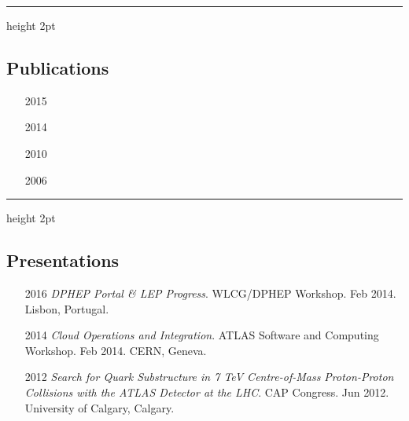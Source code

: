 \documentclass[12pt,a4paper]{article}
\newcommand{\colorrule}[1]
{
  {\color{#1}\hrule height 2pt}
  \vspace{1.0em}
}
\begin{document}
\colorrule{NavyBlue}
\subsection*{Publications}
%

\begin{itemize}
	\item[2015] 
	\item[2014] 
	\item[2010] 
	\item[2006] 
\end{itemize}


\colorrule{NavyBlue}
\subsection*{Presentations}
\begin{itemize}
	\item[2016] \emph{DPHEP Portal \& LEP Progress}. WLCG/DPHEP Workshop.  Feb
		2014. Lisbon, Portugal.
	\item[2014] \emph{Cloud Operations and Integration}. ATLAS Software and
		Computing Workshop. Feb 2014. CERN, Geneva.
	\item[2012] \emph{Search for Quark Substructure in 7 TeV Centre-of-Mass
		Proton-Proton Collisions with the ATLAS Detector at the LHC}. CAP Congress.
		Jun 2012. University of Calgary, Calgary.
\end{itemize}
\end{document}
